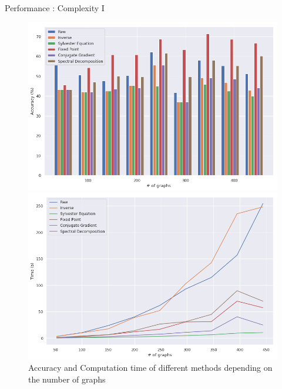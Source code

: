 \documentclass[compress]{beamer}
\begin{document}
\begin{frame}{Performance : Complexity I}
\begin{figure}[!htb]
	\begin{multicols}{2}
		\includegraphics[width=\linewidth]{data/nb_graph/acc.png}\par
		\includegraphics[width=\linewidth]{data/nb_graph/time.png}\par
	\end{multicols}
	\caption*{Accuracy and Computation time of different methods depending on the number of graphs}
\end{figure}
\end{frame}
\end{document}
